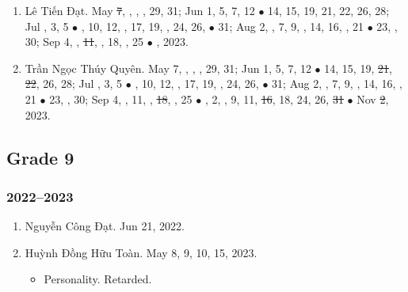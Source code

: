 \documentclass{article}
\begin{document}
\begin{enumerate}
	\item {\sc Lê Tiến Đạt.} May \st{7}, , , , 29, 31; Jun 1, 5, 7, 12 $\bullet$ 14, 15, 19, 21, 22, 26, 28; Jul , 3, 5 $\bullet$ , 10, 12, , 17, 19, , 24, 26,  $\bullet$ 31; Aug 2, , 7, 9, , 14, 16, , 21 $\bullet$ 23, , 30; Sep 4, , \st{11}, , 18, , 25 $\bullet$ , 2023. {\sf[Out]}
	\item {\sc Trần Ngọc Thúy Quyên.} May 7, , , , 29, 31; Jun 1, 5, 7, 12 $\bullet$ 14, 15, 19, \st{21}, \st{22}, 26, 28; Jul , 3, 5 $\bullet$ , 10, 12, , 17, 19, , 24, 26,  $\bullet$ 31; Aug 2, , 7, 9, , 14, 16, , 21 $\bullet$ 23, , 30; Sep 4, , 11, , \st{18}, , 25 $\bullet$ , 2, , 9, 11, \st{16}, 18, 24, 26, \st{31} $\bullet$ Nov \st{2}, 2023.
\end{enumerate}


\subsection{Grade 9}

\subsubsection{2022--2023}

\begin{enumerate}
	\item {\sc Nguyễn Công Đạt.} {\sf[In]} Jun 21, 2022. {\sf[Out]}
	\item {\sc Huỳnh Đồng Hữu Toàn.} {\sf[In]} May 8, 9, 10, 15, 2023. {\sf[Out]}
	\begin{itemize}
		\item {\sf Personality.} Retarded.
	\end{itemize}
\end{enumerate}
\end{document}
